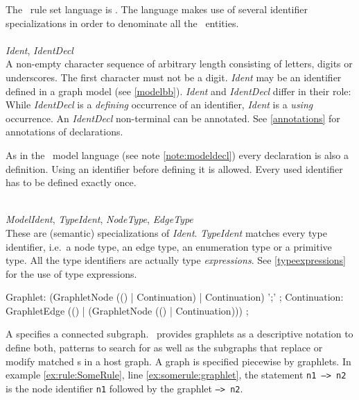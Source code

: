 The \GrG\ rule set language is . The language makes use of several identifier specializations in order to denominate all the \GrG\ entities.\\
\\
\emph{Ident}, \emph{IdentDecl}\\ \nopagebreak
A non-empty character sequence of arbitrary length consisting of letters, digits or underscores. The first character must not be a digit. \emph{Ident} may be an identifier defined in a graph model (see \ref{modelbb}). \emph{Ident} and \emph{IdentDecl} differ in their role: While \emph{IdentDecl} is a \emph{defining} occurrence of an identifier, \emph{Ident} is a \emph{using} occurrence. An \emph{IdentDecl} non-terminal can be annotated. See \ref{annotations} for annotations of declarations.
\begin{note}
  As in the \GrG\ model language (see note \ref{note:modeldecl}) every declaration is also a definition. Using an identifier before defining it is allowed. Every used identifier has to be defined exactly once.
\end{note}
\mbox{ }\\
\emph{ModelIdent}, \emph{TypeIdent}, \emph{NodeType}, \emph{EdgeType}\\
These are (semantic) specializations of \emph{Ident}. \emph{TypeIdent} matches every type identifier, i.e.\ a node type, an edge type, an enumeration type or a primitive type. All the type identifiers are actually type \emph{expressions}. See \ref{typeexpressions} for the use of type expressions.\\

\begin{rail}
  Graphlet: (GraphletNode (() | Continuation) | Continuation) ';' ;
  Continuation: GraphletEdge (() | (GraphletNode (() | Continuation))) ;
\end{rail}
A  specifies a connected subgraph. 
\GrG\ provides graphlets as a descriptive notation to define both, patterns to search for as well as the subgraphs that replace or modify matched s in a host graph. 
A graph is specified piecewise by graphlets. 
In example \ref{ex:rule:SomeRule}, line \ref{ex:somerule:graphlet}, the statement \texttt{n1 --> n2} is the node identifier \texttt{n1} followed by the  graphlet \texttt{--> n2}.

